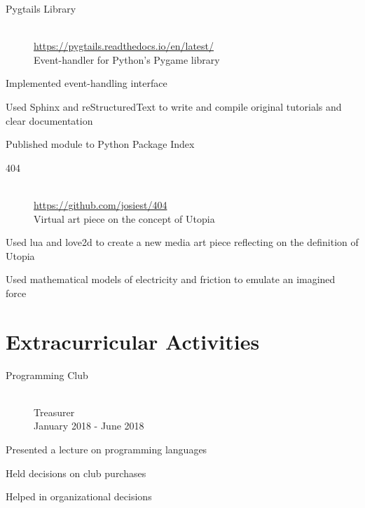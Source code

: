 \documentclass[10pt]{article}
\newenvironment{itemize*}
{\begin{itemize}[leftmargin=*]
    \setlength{\itemsep}{0pt}
    \setlength{\parskip}{0pt}}
{\end{itemize}}
\begin{document}
\begin{paracol}{2}
\begin{description}
\item[Pygtails Library]~\\
    \url{https://pygtails.readthedocs.io/en/latest/}\\
    Event-handler for Python's Pygame library
\end{description}
\begin{itemize*}
\item Implemented event-handling interface
\item Used Sphinx and reStructuredText to write and compile original tutorials and clear
      documentation
\item Published module to Python Package Index
\end{itemize*}

\begin{description}
\item[404]~\\
    \url{https://github.com/josiest/404}\\
    Virtual art piece on the concept of Utopia
\end{description}
\begin{itemize*}
\item Used lua and love2d to create a new media art piece reflecting on the definition of Utopia
\item Used mathematical models of electricity and friction to emulate an imagined force
\end{itemize*}

\section*{Extracurricular Activities}

\begin{description}
\item[Programming Club]~\\
    Treasurer\\
    January 2018 - June 2018
\end{description}
\begin{itemize*}
\item Presented a lecture on programming languages
\item Held decisions on club purchases
\item Helped in organizational decisions
\end{itemize*}
\end{paracol}
\end{document}
